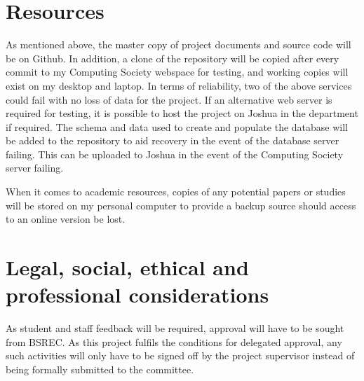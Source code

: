 \documentclass{report}
\begin{document}
\section*{Resources}
As mentioned above, the master copy of project documents and source code will be on Github. In addition, a clone of the repository will be copied after every commit to my Computing Society webspace for testing, and working copies will exist on my desktop and laptop. In terms of reliability, two of the above services could fail with no loss of data for the project. If an alternative web server is required for testing, it is possible to host the project on Joshua in the department if required. The schema and data used to create and populate the database will be added to the repository to aid recovery in the event of the database server failing. This can be uploaded to Joshua in the event of the Computing Society server failing.

When it comes to academic resources, copies of any potential papers or studies will be stored on my personal computer to provide a backup source should access to an online version be lost.
\section*{Legal, social, ethical and professional considerations}
As student and staff feedback will be required, approval will have to be sought from BSREC. As this project fulfils the conditions for delegated approval, any such activities will only have to be signed off by the project supervisor instead of being formally submitted to the committee.
\end{document}
